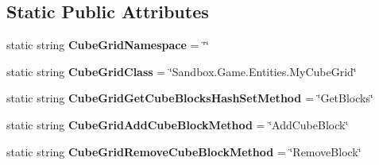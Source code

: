 \subsection*{Static Public Attributes}
\begin{DoxyCompactItemize}
\item 
\hypertarget{class_s_e_mod_a_p_i_internal_1_1_a_p_i_1_1_entity_1_1_sector_1_1_sector_object_1_1_cube_grid_entity_a1eab4f65cdd0306eff9131552ed14096}{}static string {\bfseries Cube\+Grid\+Namespace} = \char`\"{}\char`\"{}\label{class_s_e_mod_a_p_i_internal_1_1_a_p_i_1_1_entity_1_1_sector_1_1_sector_object_1_1_cube_grid_entity_a1eab4f65cdd0306eff9131552ed14096}

\item 
\hypertarget{class_s_e_mod_a_p_i_internal_1_1_a_p_i_1_1_entity_1_1_sector_1_1_sector_object_1_1_cube_grid_entity_aba436e537660732590e3877f63954bbc}{}static string {\bfseries Cube\+Grid\+Class} = \char`\"{}Sandbox.\+Game.\+Entities.\+My\+Cube\+Grid\char`\"{}\label{class_s_e_mod_a_p_i_internal_1_1_a_p_i_1_1_entity_1_1_sector_1_1_sector_object_1_1_cube_grid_entity_aba436e537660732590e3877f63954bbc}

\item 
\hypertarget{class_s_e_mod_a_p_i_internal_1_1_a_p_i_1_1_entity_1_1_sector_1_1_sector_object_1_1_cube_grid_entity_a522da72bcba94bc36274c0208836cff6}{}static string {\bfseries Cube\+Grid\+Get\+Cube\+Blocks\+Hash\+Set\+Method} = \char`\"{}Get\+Blocks\char`\"{}\label{class_s_e_mod_a_p_i_internal_1_1_a_p_i_1_1_entity_1_1_sector_1_1_sector_object_1_1_cube_grid_entity_a522da72bcba94bc36274c0208836cff6}

\item 
\hypertarget{class_s_e_mod_a_p_i_internal_1_1_a_p_i_1_1_entity_1_1_sector_1_1_sector_object_1_1_cube_grid_entity_a42985b780e21527a535c45365ab3e7c0}{}static string {\bfseries Cube\+Grid\+Add\+Cube\+Block\+Method} = \char`\"{}Add\+Cube\+Block\char`\"{}\label{class_s_e_mod_a_p_i_internal_1_1_a_p_i_1_1_entity_1_1_sector_1_1_sector_object_1_1_cube_grid_entity_a42985b780e21527a535c45365ab3e7c0}

\item 
\hypertarget{class_s_e_mod_a_p_i_internal_1_1_a_p_i_1_1_entity_1_1_sector_1_1_sector_object_1_1_cube_grid_entity_a3eab58e688fc7f4fb3c70bec77f15ada}{}static string {\bfseries Cube\+Grid\+Remove\+Cube\+Block\+Method} = \char`\"{}Remove\+Block\char`\"{}\label{class_s_e_mod_a_p_i_internal_1_1_a_p_i_1_1_entity_1_1_sector_1_1_sector_object_1_1_cube_grid_entity_a3eab58e688fc7f4fb3c70bec77f15ada}


\end{DoxyCompactItemize}
